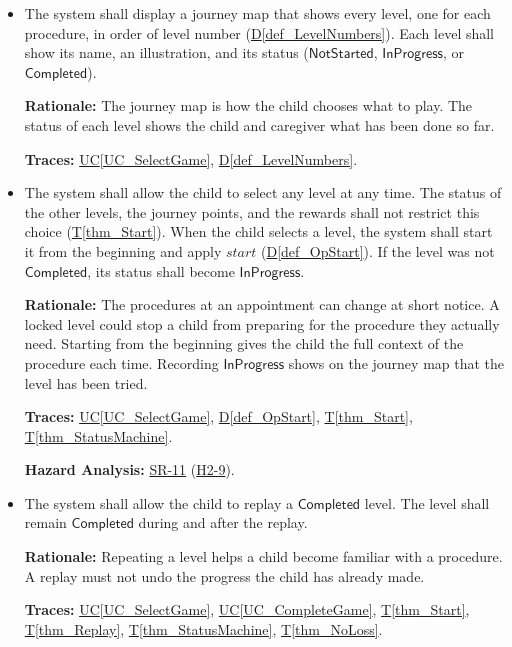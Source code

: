 \documentclass[12pt]{article}
\newcommand{\ucref}[1]{\hyperref[#1]{UC\ref*{#1}}}
\newcounter{reqnum} %
\newcommand{\thmref}[1]{\hyperref[#1]{T\ref*{#1}}}
\newcommand{\defref}[1]{\hyperref[#1]{D\ref*{#1}}}
\newcommand{\val}[1]{\ensuremath{\mathsf{#1}}}
\newcommand{\haurl}{https://team-hindsight.github.io/ophthamology-game/HazardAnalysis/HazardAnalysis.pdf}
\newcommand{\hasrref}[2]{\href{\haurl\#nameddest=sr:#1}{SR-#2}}
\newcommand{\hahazref}[2]{\href{\haurl\#nameddest=haz:#1}{H#2}}
\newcommand{\hazsr}[4]{\hasrref{#1}{#2} (\hahazref{#3}{#4})}
\begin{document}
\begin{itemize}

\item[\refstepcounter{reqnum}\textbf{FR\thereqnum}\label{FR_JourneyMap}:]
The system shall display a journey map that shows every level, one for each
procedure, in order of level number (\defref{def_LevelNumbers}). Each level
shall show its name, an illustration, and its status (\val{NotStarted},
\val{InProgress}, or \val{Completed}).

\textbf{Rationale:} The journey map is how the child chooses what to play. The
status of each level shows the child and caregiver what has been done so far.

\textbf{Traces:} \ucref{UC_SelectGame}, \defref{def_LevelNumbers}.

\item[\refstepcounter{reqnum}\textbf{FR\thereqnum}\label{FR_StartLevel}:]
The system shall allow the child to select any level at any time. The
status of the other levels, the journey points, and the rewards shall not
restrict this choice (\thmref{thm_Start}). When the child selects a level, the
system shall start it from the beginning and apply $\mathit{start}$
(\defref{def_OpStart}). If the level was not \val{Completed}, its status shall
become \val{InProgress}.

\textbf{Rationale:} The procedures at an appointment can change at short
notice. A locked level could stop a child from preparing for the procedure
they actually need. Starting from the beginning gives the child the full
context of the procedure each time. Recording \val{InProgress} shows on the
journey map that the level has been tried.

\textbf{Traces:} \ucref{UC_SelectGame}, \defref{def_OpStart},
\thmref{thm_Start}, \thmref{thm_StatusMachine}.

\textbf{Hazard Analysis:} \hazsr{AllLevelsAccessible}{11}{RestrictedLevelAccess}{2-9}.

\item[\refstepcounter{reqnum}\textbf{FR\thereqnum}\label{FR_Replay}:]
The system shall allow the child to replay a \val{Completed} level. The level
shall remain \val{Completed} during and after the replay.

\textbf{Rationale:} Repeating a level helps a child become familiar with a
procedure. A replay must not undo the progress the child has already made.

\textbf{Traces:} \ucref{UC_SelectGame}, \ucref{UC_CompleteGame},
\thmref{thm_Start}, \thmref{thm_Replay}, \thmref{thm_StatusMachine},
\thmref{thm_NoLoss}.

\end{itemize}
\end{document}
